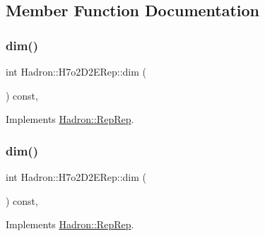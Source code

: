 \subsection{Member Function Documentation}
\mbox{\label{structHadron_1_1H7o2D2ERep_a0d67fbc1ec1b377b33be3e38873e0732}} 
\subsubsection{\texorpdfstring{dim()}{dim()}\hspace{0.1cm}{\footnotesize\ttfamily [1/5]}}
{\footnotesize\ttfamily int Hadron\+::\+H7o2\+D2\+E\+Rep\+::dim (\begin{DoxyParamCaption}{ }\end{DoxyParamCaption}) const\hspace{0.3cm}{\ttfamily [inline]}, {\ttfamily [virtual]}}



Implements \mbox{\hyperlink{structHadron_1_1RepRep_a92c8802e5ed7afd7da43ccfd5b7cd92b}{Hadron\+::\+Rep\+Rep}}.

\mbox{\label{structHadron_1_1H7o2D2ERep_a0d67fbc1ec1b377b33be3e38873e0732}} 
\subsubsection{\texorpdfstring{dim()}{dim()}\hspace{0.1cm}{\footnotesize\ttfamily [2/5]}}
{\footnotesize\ttfamily int Hadron\+::\+H7o2\+D2\+E\+Rep\+::dim (\begin{DoxyParamCaption}{ }\end{DoxyParamCaption}) const\hspace{0.3cm}{\ttfamily [inline]}, {\ttfamily [virtual]}}



Implements \mbox{\hyperlink{structHadron_1_1RepRep_a92c8802e5ed7afd7da43ccfd5b7cd92b}{Hadron\+::\+Rep\+Rep}}.

\mbox{\label{structHadron_1_1H7o2D2ERep_a0d67fbc1ec1b377b33be3e38873e0732}} 
